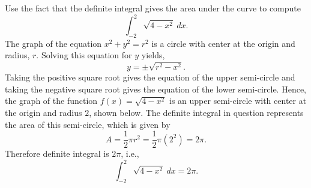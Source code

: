 \documentclass[handout]{ximera}
\begin{document}
\begin{example}[example 4]
Use the fact that the definite integral gives the area under the curve to compute
\[\int_{-2}^2 \sqrt{4-x^2} \ dx.\]
The graph of the equation $x^2 + y^2 = r^2$ is a circle with center at the origin and radius, $r$.
Solving this equation for $y$ yields,
\[
y = \pm \sqrt{r^2 - x^2}.
\]
Taking the positive square root gives the equation of the upper semi-circle and taking the negative square root gives 
the equation of the lower semi-circle.
Hence, the graph of the function $f(x) = \sqrt{4-x^2}$ is an upper semi-circle with center at the origin and radius $2$, shown below. 
The definite integral in question represents the area of this semi-circle, which is given by
\[
A = \frac12 \pi r^2 = \frac12 \pi (2^2) = 2\pi.
\]
Therefore definite integral is $2\pi$, i.e.,
\[\int_{-2}^2 \sqrt{4-x^2} \ dx =2\pi.\]









\begin{image}
\end{image}
\end{example}
\end{document}
